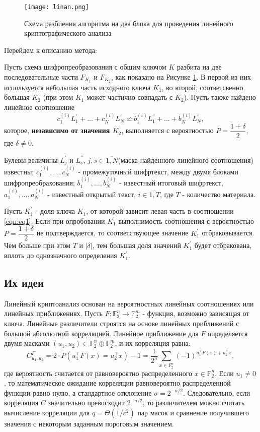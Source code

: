 \documentclass[utf8x, 14pt]{G7-32} %
\begin{document}
\begin{figure}[h!]
	\centering
	\texttt{[image: linan.png]}
	\caption{Схема разбиения алгоритма на два блока для проведения линейного криптографического анализа}
	\label{fig:linan}
\end{figure}

Перейдем к описанию метода:

Пусть схема шифропреобразования с общим ключом $K$ разбита на две последовательные части $F_{K_1}$ и $F_{K_2}$, как показано на Рисунке \ref{fig:linan}. В первой из них используется небольшая часть исходного ключа $K_1$, во второй, соответсвенно, большая $K_2$ (при этом $K_1$ может частично совпадать с $K_2$). Пусть также найдено линейное соотношение 
\begin{equation}
\label{eqn:eq1}
c_1^{(i)} L_1^{'} + ... + c_N^{(i)} L_N^{'} \backsimeq b_1^{(i)} L_1^{''} + ... + b_N^{(i)} L_N^{''} ,\end{equation}
 которое, \textbf{независимо от значения $K_2$}, выполняется с вероятностью $P = \dfrac{1+\delta}{2}$, где $\delta \neq 0$.

Булевы величины $L_j^{'}$ и $L_s^{''}$, $j,s \in \overline{1,N}$(маска найденного линейного соотношения) известны; $c_1^{(i)}, ..., c_N^{(i)}$  - промежуточный шифртекст, между двумя блоками шифропреобрахования; $b_1^{(i)}, ..., b_N^{(i)}$ - известный итоговый шифртекст, $a_1^{(i)}, ..., a_N^{(i)}$ - известный открытый текст, $i \in \overline{1,T}$, где $T$ - количество материала.

Пусть $K_1^{'}$ - доля ключа $K_1$, от которой зависит левая часть в соотношении \ref{eqn:eq1}. Если при опробовании $K_1^{'}$ выполнимость соотношения с вероятностью $P = \dfrac{1+\delta}{2}$ не подтверждается, то соответствующее значение $K_1^{'}$ отбраковывается. Чем больше при этом $T$ и $|\delta|$, тем большая доля значений $K_1^{'}$ будет отбракована, вплоть до однозначного определения $K_1^{'}$.


\subsection{Их идеи}
Линейный криптоанализ основан на вероятностных линейных соотношениях или линейных приближениях. Пусть $F: \mathbb{F}_2^n \to \mathbb{F}_2^m$ - функция, возможно зависящая от ключа. Линейные различители строятся на основе линейных приближений с большой абсолютной корреляцией. Линейное приближение для $F$ определяется двумя масками $(u_1,u_2) \in \mathbb{F}_2^n \oplus \mathbb{F}_2^m$, и их корреляция равна:
$$ C_{u_1,u_2}^F = 2\cdot P\left(u_1^\top F(x) = u_2^\top x\right)-1 = \dfrac{1}{2^n} \sum_{x\in F_2^n} (-1)^{u_1^\top F(x) + u_2^\top x},$$
где вероятность считается от равновероятно распределенного $x\in \mathbb{F}_2^n$. Если $u_1 \neq 0$, то математическое ожидание корреляции равновероятно распределенной функции равно нулю, а стандартное отклонение $\sigma = 2^{-n/2}$. Следовательно, если корреляция $C$ значительно превосходит $2^{-n/2}$, то различителем можно считать вычисление корреляции для $q=\Theta (1/c^2)$ пар масок и сравнение получившего значения с некоторым заданным пороговым значением.
\end{document}
